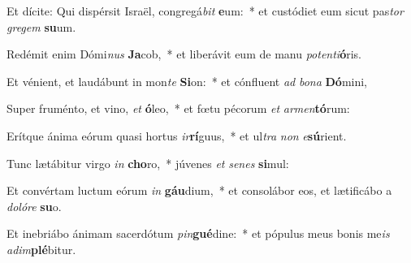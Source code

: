 \item Et dícite: Qui dispérsit Israël, congregá\textit{bit} \textbf{e}um:~* et custódiet eum sicut pas\textit{tor} \textit{gre}\textit{gem} \textbf{su}um.
\item Redémit enim Dómi\textit{nus} \textbf{Ja}cob,~* et liberávit eum de manu \textit{pot}\textit{en}\textit{ti}\textbf{ó}ris.
\item Et vénient, et laudábunt in mon\textit{te} \textbf{Si}on:~* et cónfluent \textit{ad} \textit{bo}\textit{na} \textbf{Dó}mini,
\item Super fruménto, et vino, \textit{et} \textbf{ó}leo,~* et fœtu pécorum \textit{et} \textit{ar}\textit{men}\textbf{tó}rum:
\item Erítque ánima eórum quasi hortus \textit{ir}\textbf{rí}guus,~* et ul\textit{tra} \textit{non} \textit{e}\textbf{sú}rient.
\item Tunc lætábitur virgo \textit{in} \textbf{cho}ro,~* júvenes \textit{et} \textit{se}\textit{nes} \textbf{si}mul:
\item Et convértam luctum eórum \textit{in} \textbf{gáu}dium,~* et consolábor eos, et lætificábo a \textit{do}\textit{ló}\textit{re} \textbf{su}o.
\item Et inebriábo ánimam sacerdótum \textit{pin}\textbf{gué}dine:~* et pópulus meus bonis me\textit{is} \textit{ad}\textit{im}\textbf{plé}bitur.
